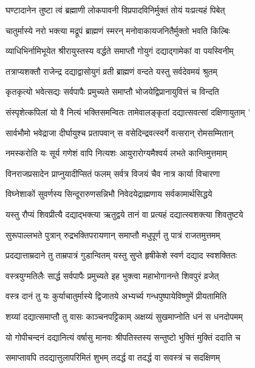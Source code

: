 \twolineshloka
{घण्टादानेन तुष्टा त्वं ब्रह्माणी लोकपावनी}
{विप्रपादविनिर्मुक्तं तोयं यःप्रत्यहं पिबेत्} %

\twolineshloka
{चातुर्मास्ये नरो भक्त्या मद्रूपं ब्राह्मणं स्मरन्}
{मनोवाकायजनितैर्मुक्तो भवति किल्बिः} %

\twolineshloka
{व्याधिभिर्नामिभूयेत श्रीरायुस्तस्य वर्द्धते}
{समाप्तौ गोयुगं दद्याद्गामेकां वा पयस्विनीम्} %

\twolineshloka
{तत्राप्यशक्तौ राजेन्द्र दद्याद्वासोयुगं व्रती}
{ब्राह्मणं वन्दते यस्तु सर्वदेवमयं श्रुतम्} %

\twolineshloka
{कृतकृत्यो भवेत्सद्यः सर्वपापैः प्रमुच्यते}
{समाप्तौ भोजयेद्विप्रानायुवित्तं च विन्दति} %

\twolineshloka
{संस्पृशेत्कपिलां यो वै नित्यं भक्तिसमन्वितः}
{तामेवालङ्कृतां दद्यात्सवत्सां दक्षिणायुताम् '} %

\twolineshloka
{सार्वभौमो भवेद्राजा दीर्घायुश्च प्रतापवान्}
{स वसेदिन्द्रवत्स्वर्गे वत्सरान् रोमसम्मितान्} %

\twolineshloka
{नमस्करोति यः सूर्य गणेशं वापि नित्यशः}
{आयुरारोग्यमैश्वर्य लभते कान्तिमुत्तमाम्} %

\twolineshloka
{विनराजप्रसादेन प्राप्नुयादीप्सितं फलम्}
{सर्वत्र विजयं चैव नात्र कार्या विचारणा} %

\twolineshloka
{विघ्नेशाकों सुवर्णस्य सिन्दूरारुणसन्निभौ}
{निवेदयेद्राह्मणाय सर्वकामार्थसिद्धये} %

\twolineshloka
{यस्तु रौप्यं शिवप्रीत्यै दद्याद्भक्त्या ऋतुद्वये}
{तानं वा प्रत्यहं दद्यात्स्वशक्त्या शिवतुष्टये} %

\twolineshloka
{सुरूपाल्लभते पुत्रान् रुद्रभक्तिपरायणान्}
{समाप्तौ मधुपूर्ण तु पात्रं राजतमुत्तमम्} %

\twolineshloka
{प्रदद्यात्ताम्रदाने तु ताम्रपात्रं गुडान्वितम्}
{यस्तु सुप्ते हृषीकेशे स्वर्ण दद्याद स्वशक्तितः} %

\twolineshloka
{वस्त्रयुग्मतिलैः सार्द्ध सर्वपापैः प्रमुच्यते}
{इह भुक्त्वा महाभोगानन्ते शिवपुरं व्रजेत्} %

\twolineshloka
{वस्त्र दानं तु यः कुर्याचातुर्मास्ये द्विजातये}
{अभ्यर्च्य गन्धपुष्पायेविष्णुमें प्रीयतामिति} %

\twolineshloka
{शय्यां दद्यात्समाप्तौ तु वासः काञ्चनपट्टिकाम्}
{अक्षय्यं सुखमाप्नोति धनं स धनदोपमम्} %

\twolineshloka
{यो गोपीचन्दनं दद्यानित्यं वर्षासु मानवः}
{श्रीपतिस्तस्य सन्तुष्टो भुक्तिं मुक्तिं ददाति च} %

\twolineshloka
{समाप्तावपि तदद्यात्तुलापरिमितं शुभम्}
{तदर्द्ध वा तदर्द्ध वा सवस्त्रं च सदक्षिणम्} %

